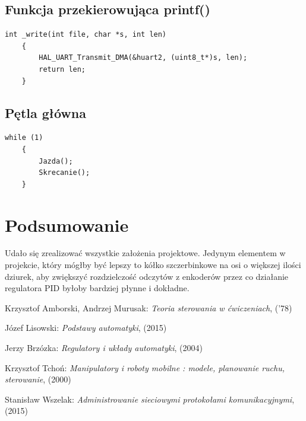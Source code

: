 \documentclass[10pt, a4paper]{article}
\begin{document}
	\subsection{Funkcja przekierowująca printf()}
	\begin{lstlisting}[tabsize=2]
	int _write(int file, char *s, int len)
	{
		HAL_UART_Transmit_DMA(&huart2, (uint8_t*)s, len);
		return len;
	}
	\end{lstlisting}
	
	\subsection{Pętla główna}
	\begin{lstlisting}[tabsize=2]
	while (1)
	{
		Jazda();
		Skrecanie();
	}
	\end{lstlisting}



\section{Podsumowanie}
Udało się zrealizować wszystkie założenia projektowe. Jedynym elementem w projekcie, który mógłby być lepszy to kółko szczerbinkowe na osi o większej ilości dziurek, aby zwiększyć rozdzielczość odczytów z enkoderów przez co działanie regulatora PID byłoby bardziej płynne i dokładne.


\newpage
{}

\begin{thebibliography}{9}
	 Krzysztof Amborski, Andrzej Murusak:
	\emph{Teoria sterowania w ćwiczeniach}, ('78)
	
	 Józef Lisowski:
	\emph{Podstawy automatyki}, (2015)
	
	 Jerzy Brzózka:
	\emph{Regulatory i układy automatyki}, (2004)
	
	 Krzysztof Tchoń:
	\emph{Manipulatory i roboty mobilne : modele, planowanie ruchu, sterowanie}, (2000)
	
	 Stanisław Wszelak:
	\emph{Administrowanie sieciowymi protokołami komunikacyjnymi}, (2015)

\end{thebibliography}
\end{document}
